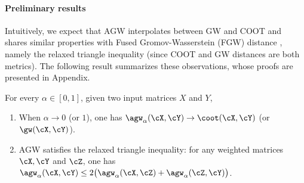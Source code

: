 \paragraph{Preliminary results}
Intuitively, we expect that AGW interpolates between GW and COOT and shares similar properties
with Fused Gromov-Wasserstein (FGW) distance \citep{Vayer19b}, namely
the relaxed triangle inequality (since COOT and GW distances are both metrics).
The following result summarizes these observations, whose proofs are presented in
Appendix.
\begin{proposition}
\label{prop:basic_prop}
For every $\alpha \in [0, 1]$, given two input matrices $X$ and $Y$,
\begin{enumerate}
    \item When $\alpha \to 0$ (or $1$), one has $\agw_{\alpha}(\cX, \cY) \to \coot(\cX, \cY)$
    (or $\gw(\cX, \cY)$).

    \item AGW satisfies the relaxed triangle inequality: for any weighted matrices $\cX, \cY$
    and $\cZ$, one has $\agw_{\alpha}(\cX, \cY) \leq 2 \big( \agw_{\alpha}(\cX, \cZ)
    + \agw_{\alpha}(\cZ,  \cY) \big)$.
\end{enumerate}
\end{proposition}

